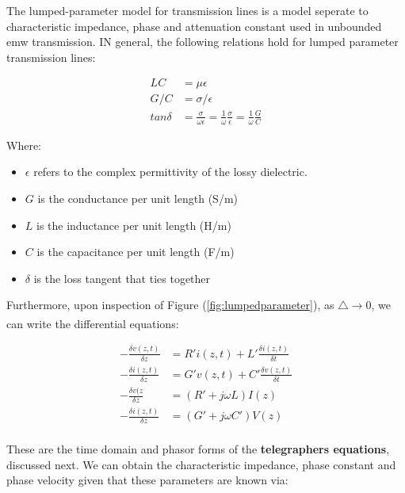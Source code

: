 \documentclass{book}
\begin{document}
The lumped-parameter model for transmission lines is a model seperate to characteristic impedance, phase and attenuation constant used in unbounded emw transmission.  IN general, the following relations hold for lumped parameter transmission lines:

\begin{align*}
	LC &= \mu \epsilon \\
	G/C&= \sigma / \epsilon \\
	tan \delta &= \frac{\sigma}{\omega \epsilon} = \frac{1}{\omega} \frac{\sigma}{\epsilon} = \frac{1}{\omega} \frac{G}{C}
\end{align*}

Where:
\begin{itemize}
	\item $\epsilon$ refers to the complex permittivity of the lossy dielectric.
	\item $G$ is the conductance per unit length (S/m)
	\item $L$ is the inductance per unit length (H/m)
	\item $C$ is the capacitance per unit length (F/m) 
	\item $\delta$ is the loss tangent that ties together  
\end{itemize}

Furthermore, upon inspection of Figure (\ref{fig:lumpedparameter}), as $\bigtriangleup \xrightarrow[]{} 0$, we can write the differential equations:

\begin{align*}
	-\frac{\delta v(z,t)}{\delta z} &= R' i(z,t) + L'\frac{\delta i(z,t)}{\delta t} \\
	-\frac{\delta i(z,t)}{\delta z} &= G' v(z,t) + C'\frac{\delta v(z,t)}{\delta t} \\ 
	-\frac{\delta v(z}{\delta z} &= (R' + j\omega L) I(z) \\
	-\frac{\delta i(z,t)}{\delta z} &= (G' + j \omega C') V(z) \\ 
\end{align*}

These are the time domain and phasor forms of the \textbf{telegraphers equations}, discussed next.
We can obtain the characteristic impedance, phase constant and phase velocity given that these parameters are known via:
\end{document}
